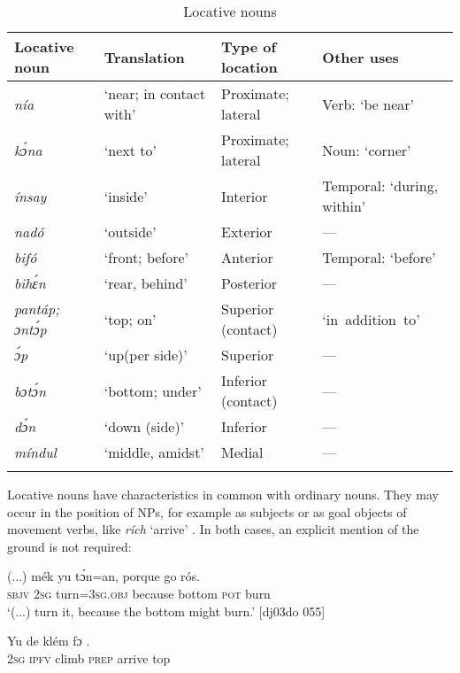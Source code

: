 \begin{table}
\caption{Locative nouns}
\label{tab:key:8.2}

\begin{tabularx}{\textwidth}{lllQ}
\lsptoprule
Locative noun & Translation & Type of location & Other uses\\
\midrule 
\itshape nía & ‘near; in contact with’ & Proximate; lateral & Verb: ‘be near’\\
\itshape kɔ́na & ‘next to’ & Proximate; lateral & Noun: ‘corner’\\
\itshape ínsay & ‘inside’ & Interior & Temporal: ‘during, within’\\
\itshape nadó & ‘outside’ & Exterior & —\\
\itshape bifó & ‘front; before’ & Anterior & Temporal: ‘before’\\
\itshape bihɛ́n & ‘rear, behind’ & Posterior & —\\
\itshape pantáp; ɔntɔ́p & ‘top; on’ & Superior (contact) & \mbox{‘in addition to’}\\
\itshape ɔ́p & ‘up(per side)’ & Superior & —\\
\itshape bɔtɔ́n & ‘bottom; under’ & Inferior (contact) & —\\
\itshape dɔ́n & ‘down (side)’ & Inferior & —\\
\itshape míndul & ‘middle, amidst’ & Medial & —\\
\lspbottomrule
\end{tabularx}
\end{table}
Locative nouns have characteristics in common with ordinary nouns. They may occur in the position of \textsc{NP}s, for example as subjects  or as goal objects of movement verbs, like \textit{rích} ‘arrive’ . In both cases, an explicit mention of the ground is not required:


\ea%
    \label{ex:key:910}
    \gll (...)  mék    yu  tɔ́n=an,    porque    go  rós.\\
{}  \textsc{sbjv}    \textsc{2sg}  turn=\textsc{3sg.obj}  because  bottom  \textsc{pot}  burn\\

\glt ‘(...) turn it, because the bottom might burn.’ [dj03do 055]
\z


\ea%
    \label{ex:key:911}
    \gll Yu  de  klém  fɔ      .\\
\textsc{2sg}  \textsc{ipfv}  climb  \textsc{prep}  arrive  top\\

